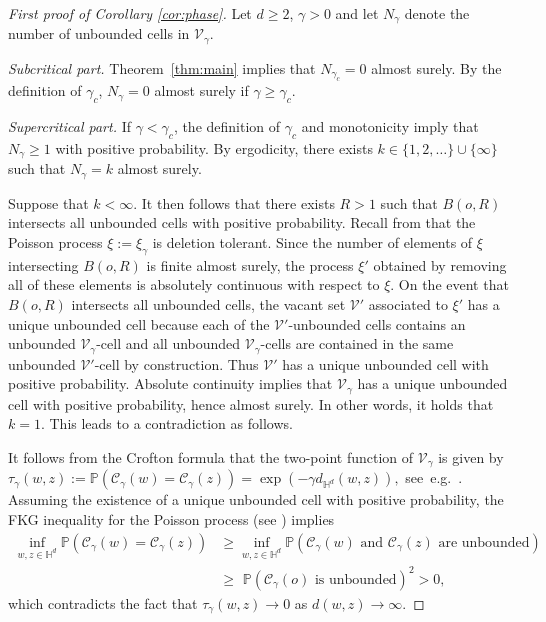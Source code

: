 \documentclass[12pt,a4paper]{article}
\theoremstyle{definition}
\begin{document}
\begin{proof}[First proof of Corollary \ref{cor:phase}] Let $d\ge2$, $\gamma>0$ and let $N_\gamma$ denote the number of unbounded cells in $\mathcal V_\gamma$.

\medskip

{\noindent\em Subcritical part.} Theorem~\ref{thm:main} implies that $N_{\gamma_c}=0$ almost surely. By the definition of  $\gamma_c$, $N_\gamma=0$ almost surely if $\gamma\ge\gamma_c$.

\medskip

{\noindent\em Supercritical part.} If $\gamma<\gamma_c$, the definition of $\gamma_c$ and monotonicity imply that $N_\gamma\ge1$ with positive probability. By ergodicity, there exists $k\in\{1,2,\ldots\}\cup\{\infty\}$ such that $N_\gamma=k$ almost surely. 

Suppose that $k<\infty$. It then follows that there exists $R>1$ such that $B(o,R)$ intersects all unbounded cells with positive probability. Recall from \cite{HS13} that the Poisson process $\xi:=\xi_\gamma$ is deletion tolerant. Since the number of elements of $\xi$ intersecting $B(o,R)$ is finite almost surely, the process $\xi'$ obtained by removing all of these elements is absolutely continuous with respect to $\xi$. On the event that $B(o,R)$ intersects all unbounded cells, the vacant set $\mathcal V'$ associated to $\xi'$ has a unique unbounded cell because each of the $\mathcal V'$-unbounded cells contains an unbounded $\mathcal V_\gamma$-cell and all unbounded $\mathcal V_\gamma$-cells are contained in the same unbounded $\mathcal V'$-cell by construction. Thus $\mathcal V'$ has a unique unbounded cell with positive probability. Absolute continuity implies that $\mathcal V_\gamma$ has a unique unbounded cell with positive probability, hence almost surely.
In other words, it holds that \(k=1\).
This leads to a contradiction as follows.

It follows from the Crofton formula that the two-point function of $\mathcal V_\gamma$ is given by $\tau_\gamma(w,z):=\mathbb P(\mathcal C_\gamma(w)=\mathcal C_\gamma(z)) = \exp(-\gamma d_{\mathbb H^d}(w,z)),$
see~e.g.~\cite{MR23}. Assuming the existence of a unique unbounded cell with positive probability, the FKG inequality for the Poisson process (see \cite[Theorem 20.4]{LP17}) implies
\begin{align*}
\inf_{w,z\in\mathbb H^d} \mathbb P( \mathcal C_\gamma(w)=\mathcal C_\gamma(z)) & \ge \inf_{w,z\in\mathbb H^d} \mathbb P( \mathcal C_\gamma(w) \text{ and } \mathcal C_\gamma(z) \text{ are unbounded}) \\
& \ge \, \, \mathbb P( \mathcal C_\gamma(o) \text{ is unbounded})^2 >0,
\end{align*}
which contradicts the fact that $\tau_\gamma(w,z)\to0$ as $d(w,z)\to\infty$.
\end{proof}
\end{document}
